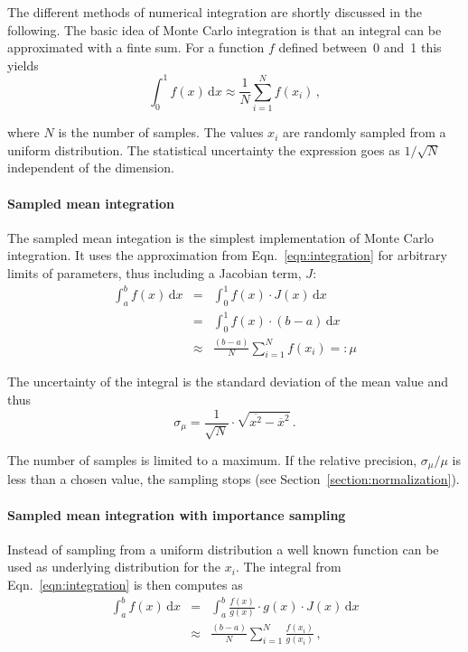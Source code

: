 \documentclass[11pt, a4paper]{article}
\begin{document}
The different methods of numerical integration are shortly discussed
in the following. The basic idea of Monte Carlo integration is that an
integral can be approximated with a finte sum. For a function $f$
defined between~0 and~1 this yields
% 
\begin{equation}
\int_{0}^{1} f(x) \, \mathrm{d}x \approx \frac{1}{N} \sum_{i=1}^{N} f(x_{i}) \, , 
\label{eqn:integration}
\end{equation} 

\noindent 
where $N$ is the number of samples. The values $x_{i}$ are randomly
sampled from a uniform distribution. The statistical uncertainty the
expression goes as $1/\sqrt{N}$ independent of the dimension. 

\paragraph{Sampled mean integration} 

The sampled mean integation is the simplest implementation of Monte
Carlo integration. It uses the approximation from
Eqn.~\ref{eqn:integration} for arbitrary limits of parameters, thus
including a Jacobian term, $J$:
%
\begin{eqnarray}
\int_{a}^{b} f(x) \, \mathrm{d}x & = & \int_{0}^{1} f(x) \cdot J(x) \, \mathrm{d}x \\ 
                                 & = & \int_{0}^{1} f(x) \cdot (b - a) \, \mathrm{d}x \\ 
				 & \approx & \frac{(b - a)}{N} \sum_{i=1}^{N} f(x_{i}) =: \mu
\end{eqnarray} 

\noindent 
The uncertainty of the integral is the standard deviation of the mean
value and thus 
%
\begin{equation}
\sigma_{\mu} = \frac{1}{\sqrt{N}} \cdot \sqrt{\overline{x^{2}} - \overline{x}^{2}} \, . 
\end{equation} 

\noindent 
The number of samples is limited to a maximum. If the relative
precision, $\sigma_{\mu}/\mu$ is less than a chosen value, the
sampling stops (see Section~\ref{section:normalization}). 

\paragraph{Sampled mean integration with importance sampling} 

Instead of sampling from a uniform distribution a well known function
can be used as underlying distribution for the $x_{i}$. The integral
from Eqn.~\ref{eqn:integration} is then computes as 
%
\begin{eqnarray}
\int_{a}^{b} f(x) \, \mathrm{d}x & = & \int_{a}^{b} \frac{f(x)}{g(x)} \cdot g(x) \cdot J(x) \, \mathrm{d}x \\ 
 & \approx & \frac{(b - a)}{N} \sum_{i=1}^{N} \frac{f(x_{i})}{g(x_{i})} \, , 
\end{eqnarray} 
\end{document}
